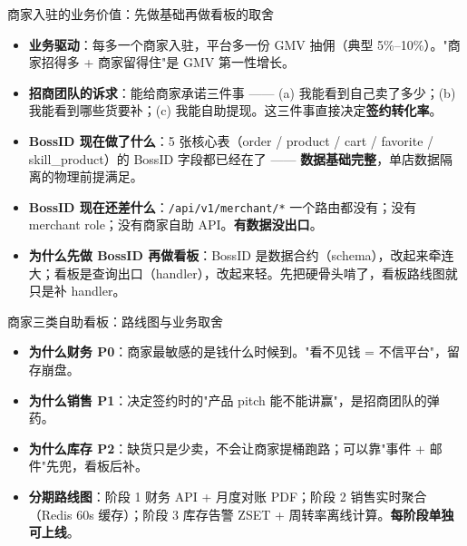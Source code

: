 \documentclass[aspectratio=169,11pt]{beamer}
\begin{document}
\begin{frame}[shrink]{商家入驻的业务价值：先做基础再做看板的取舍}
\begin{itemize}
  \item \textbf{业务驱动}：每多一个商家入驻，平台多一份 GMV 抽佣（典型 5\%--10\%）。"商家招得多 + 商家留得住"是 GMV 第一性增长。
  \item \textbf{招商团队的诉求}：能给商家承诺三件事 —— (a) 我能看到自己卖了多少；(b) 我能看到哪些货要补；(c) 我能自助提现。这三件事直接决定\textbf{签约转化率}。
  \item \textbf{BossID 现在做了什么}：5 张核心表（order / product / cart / favorite / skill\_product）的 BossID 字段都已经在了 —— \textbf{数据基础完整}，单店数据隔离的物理前提满足。
  \item \textbf{BossID 现在还差什么}：\texttt{/api/v1/merchant/*} 一个路由都没有；没有 merchant role；没有商家自助 API。\textbf{有数据没出口}。
  \item \textbf{为什么先做 BossID 再做看板}：BossID 是数据合约（schema），改起来牵连大；看板是查询出口（handler），改起来轻。先把硬骨头啃了，看板路线图就只是补 handler。
\end{itemize}
\end{frame}

\begin{frame}[shrink]{商家三类自助看板：路线图与业务取舍}
\vspace{2mm}
\begin{itemize}
  \item \textbf{为什么财务 P0}：商家最敏感的是钱什么时候到。"看不见钱 = 不信平台"，留存崩盘。
  \item \textbf{为什么销售 P1}：决定签约时的"产品 pitch 能不能讲赢"，是招商团队的弹药。
  \item \textbf{为什么库存 P2}：缺货只是少卖，不会让商家提桶跑路；可以靠"事件 + 邮件"先兜，看板后补。
  \item \textbf{分期路线图}：阶段 1 财务 API + 月度对账 PDF；阶段 2 销售实时聚合（Redis 60s 缓存）；阶段 3 库存告警 ZSET + 周转率离线计算。\textbf{每阶段单独可上线}。
\end{itemize}
\end{frame}
\end{document}
